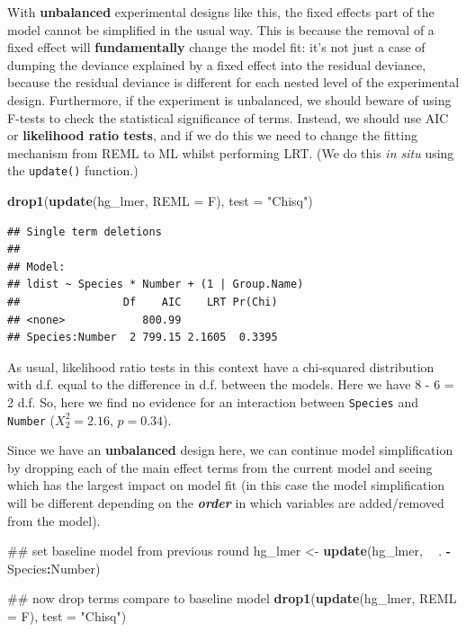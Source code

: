 \documentclass[]{book}
\newenvironment{Shaded}{\begin{snugshade}}{\end{snugshade}}
\newcommand{\KeywordTok}[1]{\textcolor[rgb]{0.13,0.29,0.53}{\textbf{#1}}}
\newcommand{\DataTypeTok}[1]{\textcolor[rgb]{0.13,0.29,0.53}{#1}}
\newcommand{\StringTok}[1]{\textcolor[rgb]{0.31,0.60,0.02}{#1}}
\newcommand{\OperatorTok}[1]{\textcolor[rgb]{0.81,0.36,0.00}{\textbf{#1}}}
\newcommand{\NormalTok}[1]{#1}
\theoremstyle{definition}
\theoremstyle{definition}
\theoremstyle{definition}
\theoremstyle{remark}
\begin{document}
With \textbf{unbalanced} experimental designs like this, the fixed
effects part of the model cannot be simplified in the usual way. This is
because the removal of a fixed effect will \textbf{fundamentally} change
the model fit: it's not just a case of dumping the deviance explained by
a fixed effect into the residual deviance, because the residual deviance
is different for each nested level of the experimental design.
Furthermore, if the experiment is unbalanced, we should beware of using
F-tests to check the statistical significance of terms. Instead, we
should use AIC or \textbf{likelihood ratio tests}, and if we do this we
need to change the fitting mechanism from REML to ML whilst performing
LRT. (We do this \emph{in situ} using the \texttt{update()} function.)

\begin{Shaded}
\begin{Highlighting}[]
\KeywordTok{drop1}\NormalTok{(}\KeywordTok{update}\NormalTok{(hg_lmer, }\DataTypeTok{REML =}\NormalTok{ F), }\DataTypeTok{test =} \StringTok{"Chisq"}\NormalTok{)}
\end{Highlighting}
\end{Shaded}

\begin{verbatim}
## Single term deletions
## 
## Model:
## ldist ~ Species * Number + (1 | Group.Name)
##                Df    AIC    LRT Pr(Chi)
## <none>            800.99               
## Species:Number  2 799.15 2.1605  0.3395
\end{verbatim}

As usual, likelihood ratio tests in this context have a chi-squared
distribution with d.f. equal to the difference in d.f. between the
models. Here we have 8 - 6 = 2 d.f. So, here we find no evidence for an
interaction between \texttt{Species} and \texttt{Number}
(\(X^2_2 = 2.16\), \(p = 0.34\)).

Since we have an \textbf{unbalanced} design here, we can continue model
simplification by dropping each of the main effect terms from the
current model and seeing which has the largest impact on model fit (in
this case the model simplification will be different depending on the
\textbf{\emph{order}} in which variables are added/removed from the
model).

\small

\begin{Shaded}
\begin{Highlighting}[]
\NormalTok{## set baseline model from previous round}
\NormalTok{hg_lmer <-}\StringTok{ }\KeywordTok{update}\NormalTok{(hg_lmer, }\OperatorTok{~}\StringTok{ }\NormalTok{. }\OperatorTok{-}\StringTok{ }\NormalTok{Species}\OperatorTok{:}\NormalTok{Number)}

\NormalTok{## now drop terms compare to baseline model}
\KeywordTok{drop1}\NormalTok{(}\KeywordTok{update}\NormalTok{(hg_lmer, }\DataTypeTok{REML =}\NormalTok{ F), }\DataTypeTok{test =} \StringTok{"Chisq"}\NormalTok{)}
\end{Highlighting}
\end{Shaded}
\end{document}
